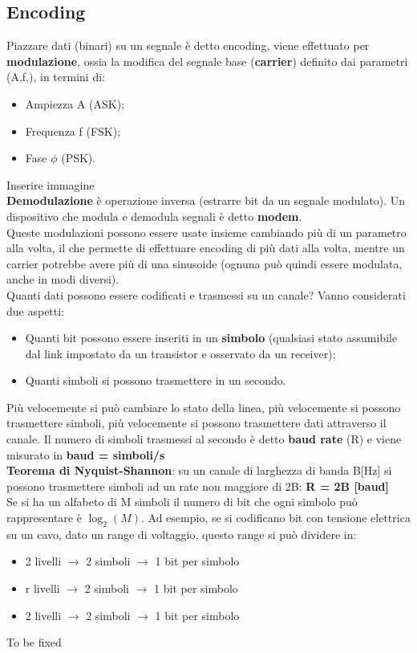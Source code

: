 \documentclass{article}
\begin{document}
      \subsection{Encoding}
        Piazzare dati (binari) su un segnale è detto encoding, viene effettuato per \textbf{modulazione}, ossia la modifica del segnale base (\textbf{carrier}) definito dai parametri (A,f,\phi), in termini di:
        \begin{itemize}
          \item Ampiezza A (ASK);
          \item Frequenza f (FSK);
          \item Fase $\phi$ (PSK). 
        \end{itemize}
        Inserire immagine \\
        \textbf{Demodulazione} è operazione inversa (estrarre bit da un segnale modulato). Un dispositivo che modula e demodula segnali è detto \textbf{modem}. \\
        Queste modulazioni possono essere usate insieme cambiando più di un parametro alla volta, il che permette di effettuare encoding di più dati alla volta, mentre un carrier potrebbe avere più di una sinusoide (ognuna può quindi essere modulata, anche in modi diversi). \\
        Quanti dati possono essere codificati e trasmessi su un canale?  Vanno considerati due aspetti:
        \begin{itemize}
          \item Quanti bit possono essere inseriti in un \textbf{simbolo} (qualsiasi stato assumibile dal link impostato da un transistor e osservato da un receiver);
          \item Quanti simboli si possono trasmettere in un secondo.
        \end{itemize}
        Più velocemente si può cambiare lo stato della linea, più velocemente si possono trasmettere simboli, più velocemente si possono trasmettere dati attraverso il canale. Il numero di simboli trasmessi al secondo è detto \textbf{baud rate} (R) e viene misurato in \textbf{baud = simboli/s} \\
        \textbf{Teorema di Nyquist-Shannon}: su un canale di larghezza di banda B[Hz] si possono trasmettere simboli ad un rate non maggiore di 2B: \textbf{R = 2B [baud]} \\
        Se si ha un alfabeto di M simboli il numero di bit che ogni simbolo può rappresentare è $\log_2(M)$. Ad esempio, se si codificano bit con tensione elettrica su un cavo, dato un range di voltaggio, questo range si può dividere in:
        \begin{itemize}
          \item 2 livelli $\rightarrow$ 2 simboli $\rightarrow$ 1 bit per simbolo
          \item r livelli $\rightarrow$ 2 simboli $\rightarrow$ 1 bit per simbolo
          \item 2 livelli $\rightarrow$ 2 simboli $\rightarrow$ 1 bit per simbolo
        \end{itemize}
        To be fixed \\
\end{document}
